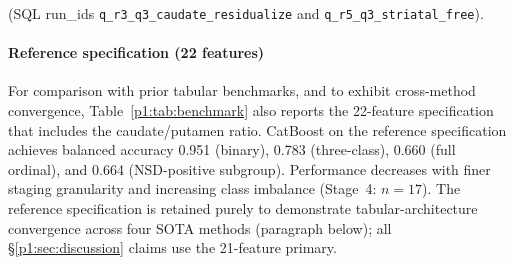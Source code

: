 (SQL run\_ids \texttt{q\_r3\_q3\_caudate\_residualize} and \texttt{q\_r5\_q3\_striatal\_free}).

\paragraph*{Reference specification (22 features)} For comparison with prior tabular benchmarks, and to exhibit cross-method convergence, Table~\ref{p1:tab:benchmark} also reports the 22-feature specification that includes the caudate/putamen ratio. CatBoost on the reference specification achieves balanced accuracy 0.951 (binary), 0.783 (three-class), 0.660 (full ordinal), and 0.664 (NSD-positive subgroup). Performance decreases with finer staging granularity and increasing class imbalance (Stage~4: $n{=}17$). The reference specification is retained purely to demonstrate tabular-architecture convergence across four SOTA methods (paragraph below); all \S\ref{p1:sec:discussion} claims use the 21-feature primary.

